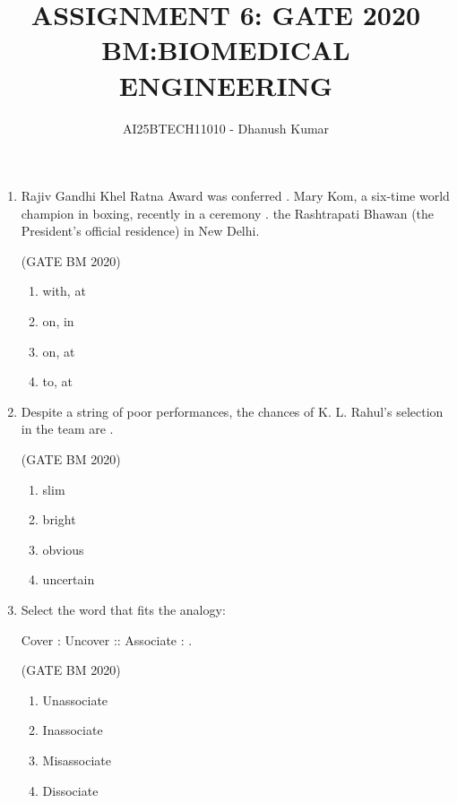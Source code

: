 \documentclass[journal]{IEEEtran}
\begin{document}
\title{
ASSIGNMENT 6: GATE 2020 \\
BM:BIOMEDICAL ENGINEERING}
\author{AI25BTECH11010 - Dhanush Kumar}
\maketitle
\renewcommand{\thefigure}{\theenumi}
\renewcommand{\thetable}{\theenumi}

\begin{enumerate}

\item Rajiv Gandhi Khel Ratna Award was conferred \underline{\hspace{2cm}}. Mary Kom, a six-time world champion in boxing, recently in a ceremony \underline{\hspace{2cm}}. the Rashtrapati Bhawan (the President’s official residence) in New Delhi.  


	\hfill(GATE BM 2020)
\begin{multicols}{2}
\begin{enumerate}
  \item with, at
  \item on, in
  \item on, at
  \item to, at
\end{enumerate}
\end{multicols}

\item Despite a string of poor performances, the chances of K. L. Rahul’s selection in the team are \underline{\hspace{2cm}}.  

	\hfill(GATE BM 2020)
\begin{multicols}{2}
\begin{enumerate}
  \item slim
  \item bright
  \item obvious
  \item uncertain
\end{enumerate}
\end{multicols}


\item Select the word that fits the analogy:  

Cover : Uncover :: Associate : \underline{\hspace{2cm}}.  

\hfill(GATE BM 2020)
\begin{multicols}{2}
\begin{enumerate}
  \item Unassociate
  \item Inassociate
  \item Misassociate
  \item Dissociate
\end{enumerate}
\end{multicols}


\end{enumerate}
\end{document}
